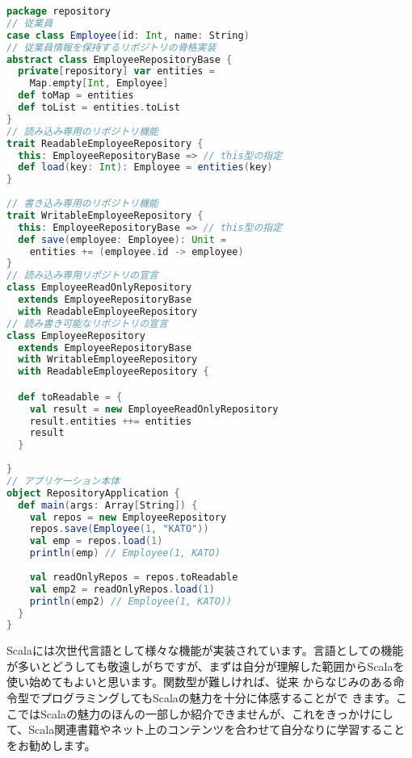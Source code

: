 \begin{lstlisting}[language=scala, label=src:trait_mixin, caption=複数のトレイトを使ったミックスインの例]
package repository
// 従業員
case class Employee(id: Int, name: String)
// 従業員情報を保持するリポジトリの骨格実装
abstract class EmployeeRepositoryBase {
  private[repository] var entities =
    Map.empty[Int, Employee]
  def toMap = entities
  def toList = entities.toList
}
// 読み込み専用のリポジトリ機能
trait ReadableEmployeeRepository {
  this: EmployeeRepositoryBase => // this型の指定
  def load(key: Int): Employee = entities(key)
}
  
// 書き込み専用のリポジトリ機能
trait WritableEmployeeRepository {
  this: EmployeeRepositoryBase => // this型の指定
  def save(employee: Employee): Unit =
    entities += (employee.id -> employee)
}
// 読み込み専用リポジトリの宣言
class EmployeeReadOnlyRepository
  extends EmployeeRepositoryBase
  with ReadableEmployeeRepository
// 読み書き可能なリポジトリの宣言
class EmployeeRepository
  extends EmployeeRepositoryBase
  with WritableEmployeeRepository
  with ReadableEmployeeRepository {

  def toReadable = {
    val result = new EmployeeReadOnlyRepository
    result.entities ++= entities
    result
  }
   
}
// アプリケーション本体
object RepositoryApplication {
  def main(args: Array[String]) {
    val repos = new EmployeeRepository
    repos.save(Employee(1, "KATO"))
    val emp = repos.load(1)
    println(emp) // Employee(1, KATO)
     
    val readOnlyRepos = repos.toReadable
    val emp2 = readOnlyRepos.load(1)
    println(emp2) // Employee(1, KATO))
  }
} 
\end{lstlisting} 

Scalaには次世代言語として様々な機能が実装されています。言語としての機能が多いとどうしても敬遠しがちですが、まずは自分が理解した範囲からScalaを使い始めてもよいと思います。関数型が難しければ、従来 からなじみのある命令型でプログラミングしてもScalaの魅力を十分に体感することがで きます。ここではScalaの魅力のほんの一部しか紹介できませんが、これをきっかけにして、Scala関連書籍やネット上のコンテンツを合わせて自分なりに学習することをお勧めします。
